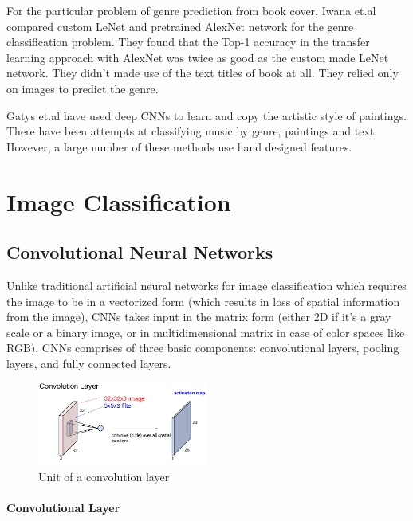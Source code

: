 \documentclass[conference]{IEEEtran}
\begin{document}
For the particular problem of genre prediction from book cover, Iwana et.al\cite{b3} compared custom LeNet\cite{b4} and pretrained AlexNet network for the genre classification problem. They found that  the Top-1 accuracy in the transfer learning approach with AlexNet was twice as good as the custom made LeNet network. They didn’t made use of the text titles of book at all. They relied only on images to predict the genre. 

Gatys et.al\cite{b5} have used deep CNNs to learn and copy the artistic style of paintings. There have been attempts at classifying music by genre, paintings and text. However, a large number of these methods use hand designed features.



\section{Image Classification}

\subsection{Convolutional Neural Networks} 

Unlike traditional artificial neural networks for image classification which requires the image to be in a vectorized form (which results in loss of spatial information from the image), CNNs takes input in the matrix form (either 2D if it’s a gray scale or a binary image, or in multidimensional matrix in case of color spaces like RGB). CNNs comprises of three basic components: convolutional layers, pooling layers, and fully connected layers.

\begin{figure}[htbp]
\centerline{\includegraphics[width=0.5\textwidth]{pics/image_theory/clayer.png}}
\caption{ Unit of a convolution layer}
\label{figi:clayer}
\end{figure}%

\paragraph{Convolutional Layer\\}
\end{document}
